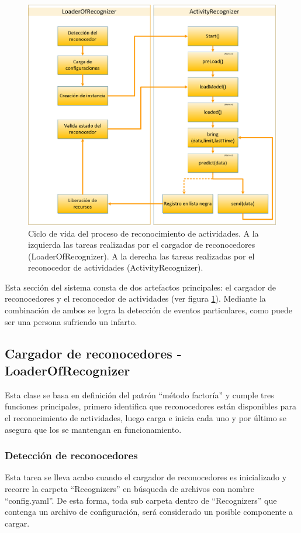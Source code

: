         \begin{figure}[ht!]
        	\centering
        	\includegraphics[width=0.9\linewidth]{imgs/03-Architecture/03-HARLifeCicle.png}
        	\caption[Ciclo de vida del proceso de reconocimiento de actividades]{Ciclo de vida del proceso de reconocimiento de actividades. A la izquierda las tareas realizadas por el cargador de reconocedores (LoaderOfRecognizer). A la derecha las tareas realizadas por el reconocedor de actividades (ActivityRecognizer).}
    	    \label{fig:HARLifeCicle}
        \end{figure}%
    
    Esta sección del sistema consta de dos artefactos principales: el cargador de reconocedores y el reconocedor de actividades (ver figura \ref{fig:HARLifeCicle}). Mediante la combinación de ambos se logra la detección de eventos particulares, como puede ser una persona sufriendo un infarto.
    
    \subsection{Cargador de reconocedores - LoaderOfRecognizer}
    \label{LoaderHAR}
        Esta clase se basa en definición del patrón ``método factoría'' y cumple tres funciones principales, primero identifica que reconocedores están disponibles para el reconocimiento de actividades, luego carga e inicia cada uno y por último se asegura que los se mantengan en funcionamiento.
        
        \subsubsection{Detección de reconocedores}
        \label{sub2:HARDetection}
            Esta tarea se lleva acabo cuando el cargador de reconocedores es inicializado y recorre la carpeta ``Recognizers'' en búsqueda de archivos con nombre ``config.yaml''. De esta forma, toda sub carpeta dentro de ``Recognizers'' que contenga un archivo de configuración, será considerado un posible componente a cargar.
            
